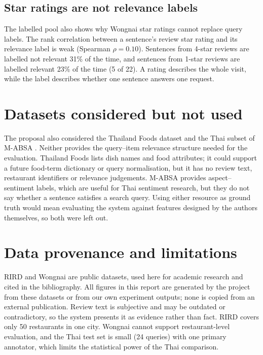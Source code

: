 \subsection{Star ratings are not relevance labels}
The labelled pool also shows why Wongnai star ratings cannot replace query labels. The rank
correlation between a sentence's review star rating and its relevance label is weak (Spearman
$\rho = 0.10$). Sentences from 4-star reviews are labelled not relevant 31\% of the time, and
sentences from 1-star reviews are labelled relevant 23\% of the time (5 of 22). A rating describes the
whole visit, while the label describes whether one sentence answers one request.

\section{Datasets considered but not used}
The proposal also considered the Thailand Foods dataset \citep{thailandfoods} and the Thai
subset of M-ABSA \citep{mabsa}. Neither provides the query--item relevance structure needed for
the evaluation. Thailand Foods lists dish names and food attributes; it could support a future
food-term dictionary or query normalisation, but it has no review text, restaurant identifiers
or relevance judgements. M-ABSA provides aspect--sentiment labels, which are useful for Thai
sentiment research, but they do not say whether a sentence satisfies a search query. Using either
resource as ground truth would mean evaluating the system against features designed by the
authors themselves, so both were left out.

\section{Data provenance and limitations}
RIRD and Wongnai are public datasets, used here for academic research and cited in the
bibliography. All figures in this report are generated by the project from these datasets or
from our own experiment outputs; none is copied from an external publication. Review text is
subjective and may be outdated or contradictory, so the system presents it as evidence rather
than fact. RIRD covers only 50 restaurants in one city. Wongnai cannot support restaurant-level
evaluation, and the Thai test set is small (24 queries) with one primary annotator, which limits
the statistical power of the Thai comparison.
